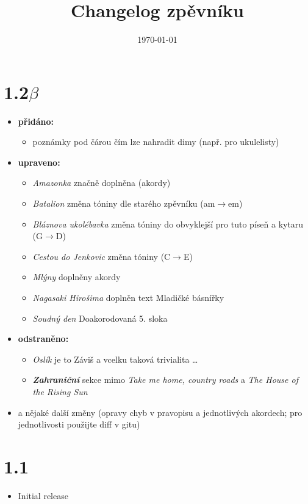 \documentclass[11pt]{article}
\title{Changelog zpěvníku}
\date{\today}
\begin{document}
\maketitle


\section*{1.2$\beta$}
\begin{itemize}
    \item \textbf{přidáno:}
    \begin{itemize}
        \item poznámky pod čárou čím lze nahradit dimy (např. pro ukulelisty)
    \end{itemize}
    
    \item \textbf{upraveno:}
    \begin{itemize}
        \item \textit{Amazonka} značně doplněna (akordy)
        \item \textit{Batalion} změna tóniny dle starého zpěvníku (am$\rightarrow$em)
        \item \textit{Bláznova ukolébavka} změna tóniny do obvyklejší pro tuto píseň a kytaru (G$\rightarrow$D)
        \item \textit{Cestou do Jenkovic} změna tóniny (C$\rightarrow$E)
        \item \textit{Mlýny} doplněny akordy
        \item \textit{Nagasaki Hirošima} doplněn text Mladičké básnířky 
        \item \textit{Soudný den} Doakorodovaná  5. sloka 
        
    \end{itemize}
    
    \item \textbf{odstraněno:}
    \begin{itemize}
        \item \textit{Oslík} je to Záviš a vcelku taková trivialita \dots
        \item \textbf{\textit{Zahraniční}} sekce mimo \textit{Take me home, country roads} a \textit{The House of the Rising Sun}
        
    \end{itemize}

    \item a nějaké další změny (opravy chyb v pravopisu a jednotlivých akordech; pro jednotlivosti použijte diff v gitu)
    
\end{itemize}

\section*{1.1}
\begin{itemize}
    \item Initial release
\end{itemize}
\end{document}
